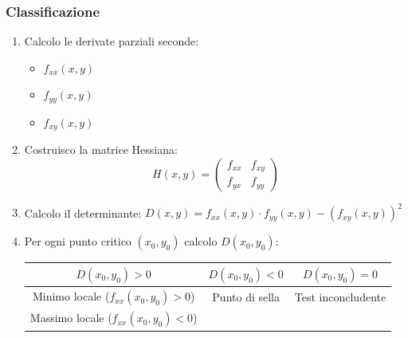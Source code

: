 \documentclass[10pt, a4paper]{article}
\begin{document}
        \subsubsection{Classificazione}
            \begin{enumerate}
                \item Calcolo le derivate parziali seconde: \begin{itemize}
                    \item $f_{xx}(x,y)$
                    \item $f_{yy}(x,y)$
                    \item $f_{xy}(x,y)$
                \end{itemize}
                \item Costruisco la matrice Hessiana: \begin{equation*}
                    H(x,y)=\begin{pmatrix}
                        f_{xx} & f_{xy} \\
                        f_{yx} & f_{yy}
                    \end{pmatrix}
                \end{equation*}
                \item Calcolo il determinante: $D(x,y)=f_{xx}(x,y)\cdot f_{yy}(x,y)-\left(f_{xy}(x,y)\right)^2$
                \item Per ogni punto critico $(x_0,y_0)$ calcolo $D(x_0,y_0)$:
                \\\begin{tabular}{| c | c | c |}
                    \hline
                    $D(x_0,y_0)>0$ & $D(x_0,y_0)<0$ & $D(x_0,y_0)=0$\\
                    \hline
                        Minimo locale ($f_{xx}(x_0,y_0)>0$) & Punto di sella & Test inconcludente \\
                        Massimo locale ($f_{xx}(x_0,y_0)<0$) & & \\
                    \hline
                \end{tabular}
            \end{enumerate}
\end{document}
